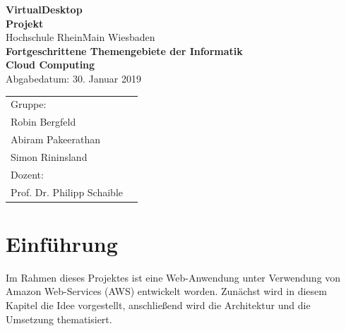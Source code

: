 \documentclass[a4paper, 12pt]{scrreprt}
\renewcommand\_{\textunderscore\allowbreak}
\begin{document}
\begin{titlepage}
    \begin{center}
    \LARGE \textbf{VirtualDesktop} \\
    \vspace{2.5cm}
    \large\textbf{Projekt}\\
    \vspace{2.5cm}
    \normalsize
    Hochschule RheinMain Wiesbaden \\
    \vspace{2cm}
    \large \textbf{Fortgeschrittene Themengebiete der Informatik\\ Cloud Computing\\}
    \vspace{1cm}
    \normalsize
    Abgabedatum: 30. Januar 2019\\
    \vspace{2.7cm}
    \end{center}
 \normalsize{
    \begin{tabular}{ll}
    	Gruppe: & \\
    	Robin Bergfeld & \\
    	Abiram Pakeerathan & \\
    	Simon Rininsland & \\[0.5cm]
    	Dozent: &\\
        Prof. Dr. Philipp Schaible & \\
    \end{tabular}
    }
\end{titlepage}



\clearpage
\tableofcontents
\clearpage



\chapter{Einführung}
Im Rahmen dieses Projektes ist eine Web-Anwendung unter Verwendung von Amazon Web-Services (AWS) entwickelt worden. Zunächst wird in diesem Kapitel die Idee vorgestellt, anschließend wird die Architektur und die Umsetzung thematisiert.
\end{document}
